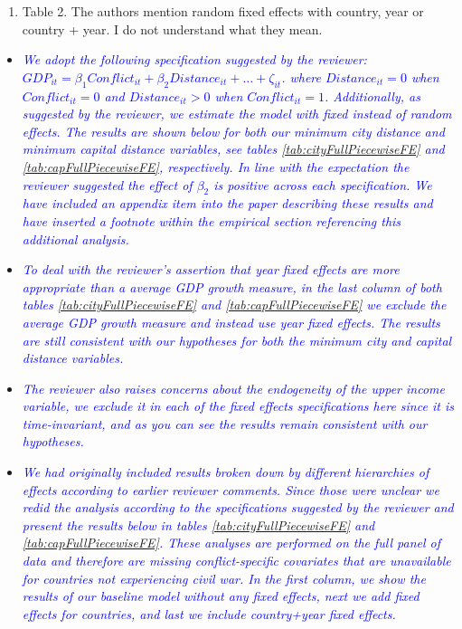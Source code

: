 \begin{enumerate}
\begin{enumerate}
	\item Table 2. The authors mention random fixed effects with country, year or country + year. I do not understand what they mean. \\
\end{enumerate}

\begin{itemize}
\item \textcolor{blue}{\emph{
	We adopt the following specification suggested by the reviewer: $GDP_{it} = \beta_{1}Conflict_{it} + \beta_{2}Distance_{it}+\ldots+\zeta_{it}$. where $Distance_{it}=0$ when $Conflict_{it}=0$ and $Distance_{it}>0$ when $Conflict_{it}=1$. Additionally, as suggested by the reviewer, we estimate the model with fixed instead of random effects. The results are shown below for both our minimum city distance and minimum capital distance variables, see tables \ref{tab:cityFullPiecewiseFE} and \ref{tab:capFullPiecewiseFE}, respectively. In line with the expectation the reviewer suggested the effect of $\beta_{2}$ is positive across each specification. We have included an appendix item into the paper describing these results and have inserted a footnote within the empirical section referencing this additional analysis.
}} \\

\item \textcolor{blue}{\emph{
	To deal with the reviewer's assertion that year fixed effects are more appropriate than a average GDP growth measure, in the last column of both tables \ref{tab:cityFullPiecewiseFE} and \ref{tab:capFullPiecewiseFE} we exclude the average GDP growth measure and instead use year fixed effects. The results are still consistent with our hypotheses for both the minimum city and capital distance variables.
}} \\

\item \textcolor{blue}{\emph{
	The reviewer also raises concerns about the endogeneity of the upper income variable, we exclude it in each of the fixed effects specifications here since it is time-invariant, and as you can see the results remain consistent with our hypotheses.
}} \\

\item \textcolor{blue}{\emph{
	We had originally included results broken down by different hierarchies of effects according to earlier reviewer comments. Since those were unclear we redid the analysis according to the specifications suggested by the reviewer and present the results below in tables \ref{tab:cityFullPiecewiseFE} and \ref{tab:capFullPiecewiseFE}. These analyses are performed on the full panel of data and therefore are missing conflict-specific covariates that are unavailable for countries not experiencing civil war. In the first column, we show the results of our baseline model without any fixed effects, next we add fixed effects for countries, and last we include country+year fixed effects.
}} \\


\end{itemize}
\end{enumerate}
